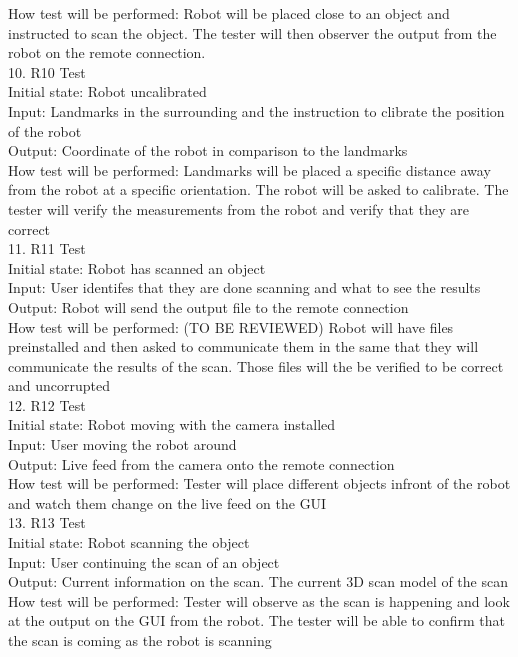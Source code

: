 \documentclass[12pt, titlepage]{article}
\begin{document}
\begin{enumerate}
How test will be performed: Robot will be placed close to an object and instructed to scan the object. The tester will then observer the output from the robot on the remote connection. \\
10.	R10 Test \\
Initial state: Robot uncalibrated \\
Input: Landmarks in the surrounding and the instruction to clibrate the position of the robot \\
Output: Coordinate of the robot in comparison to the landmarks\\
How test will be performed: Landmarks will be placed a specific distance away from the robot at a specific orientation. The robot will be asked to calibrate. The tester will verify the measurements from the robot and verify that they are correct \\
11.	R11 Test \\
Initial state: Robot has scanned an object \\
Input: User identifes that they are done scanning and what to see the results \\
Output: Robot will send the output file to the remote connection  \\
How test will be performed: (TO BE REVIEWED) Robot will have files preinstalled and then asked to communicate them in the same that they will communicate the results of the scan. Those files will the be verified to be correct and uncorrupted \\
12.	R12 Test \\
Initial state: Robot moving with the camera installed \\
Input: User moving the robot around \\
Output: Live feed from the camera onto the remote connection \\
How test will be performed: Tester will place different objects infront of the robot and watch them change on the live feed on the GUI\\
13.	R13 Test \\
Initial state: Robot scanning the object\\
Input: User continuing the scan of an object \\
Output: Current information on the scan. The current 3D scan model of the scan\\
How test will be performed: Tester will observe as the scan is happening and look at the output on the GUI from the robot. The tester will be able to confirm that the scan is coming as the robot is scanning\\

\end{enumerate}
\end{document}
